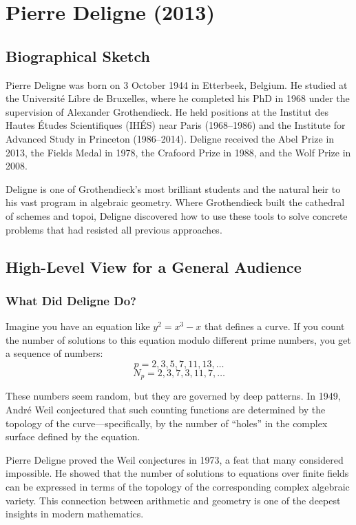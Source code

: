 \chapter{Pierre Deligne (2013)}

\section{Biographical Sketch}

Pierre Deligne was born on 3 October 1944 in Etterbeek, Belgium. He studied at the Universit\'e Libre de Bruxelles, where he completed his PhD in 1968 under the supervision of Alexander Grothendieck. He held positions at the Institut des Hautes \'Etudes Scientifiques (IH\'ES) near Paris (1968--1986) and the Institute for Advanced Study in Princeton (1986--2014). Deligne received the Abel Prize in 2013, the Fields Medal in 1978, the Crafoord Prize in 1988, and the Wolf Prize in 2008.

Deligne is one of Grothendieck's most brilliant students and the natural heir to his vast program in algebraic geometry. Where Grothendieck built the cathedral of schemes and topoi, Deligne discovered how to use these tools to solve concrete problems that had resisted all previous approaches.

\section{High-Level View for a General Audience}

\subsection{What Did Deligne Do?}

Imagine you have an equation like $y^2 = x^3 - x$ that defines a curve. If you count the number of solutions to this equation modulo different prime numbers, you get a sequence of numbers:
\[
p = 2, 3, 5, 7, 11, 13, \ldots
\]
\[
N_p = 2, 3, 7, 3, 11, 7, \ldots
\]

These numbers seem random, but they are governed by deep patterns. In 1949, Andr\'e Weil conjectured that such counting functions are determined by the topology of the curve---specifically, by the number of ``holes'' in the complex surface defined by the equation.

Pierre Deligne proved the Weil conjectures in 1973, a feat that many considered impossible. He showed that the number of solutions to equations over finite fields can be expressed in terms of the topology of the corresponding complex algebraic variety. This connection between arithmetic and geometry is one of the deepest insights in modern mathematics.

